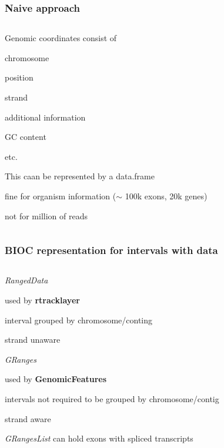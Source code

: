 \documentclass{beamer}
\begin{document}
\begin{frame}
\frametitle{Naive approach}
\begin{column}{1\textwidth}
  \bit
      \item   Genomic coordinates consist of
        \bit
            \item chromosome 
            \item position
            \item strand
            \item additional information
              \bit
                  \item GC content
                  \item etc.
              \eit
        \eit
      \item This caan be represented by a data.frame
        \bit
            \item fine for organism information ($\sim$ 100k exons, 20k genes)
            \item not for million of reads 
        \eit
  \eit
\end{column}
\end{frame}


\begin{frame}
\frametitle{BIOC representation for intervals with data}
\begin{column}{1\textwidth}
  \bit
      \item \emph{RangedData}
        \bit
            \item used by \textbf{rtracklayer}
            \item interval grouped by chromosome/conting
            \item strand unaware
        \eit
      \item \emph{GRanges}
        \bit
          \item used by \textbf{GenomicFeatures}
          \item intervals not required to be grouped by chromosome/contig
          \item strand aware
          \item \emph{GRangesList} can hold exons with spliced transcripts 
        \eit
  \eit
\end{column}
\end{frame}

\end{document}
